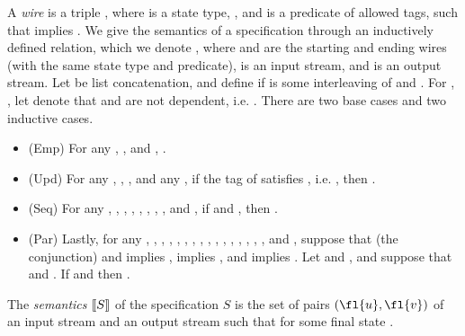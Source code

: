 \begin{definition}
\label{def:prog-model-semantics}
A \emph{wire} is a triple
,
where
 is a state type,
,
and 
is a predicate of allowed tags,
such that  implies .
We give the semantics of a specification through an
inductively defined relation, which we denote
,
where
 and 
are the starting and ending wires
(with the same state type and predicate),
 is an input stream,
and  is an output stream.
Let  be list concatenation, and
define  if  is some interleaving of  and .
For , ,
let  denote that
 and  are not dependent, i.e.
\fl{,}\fl{))}.
There are two base cases and two inductive cases.
\begin{itemize}
\item (Emp)
For any , , and ,
.
\item (Upd)
For any , , , and any ,
if the tag of  satisfies , i.e.
\fl{)}, then
.
\item (Seq)
For any , , , , ,
, , , and , if
and
,
then
.
\item (Par)
Lastly, for any
, , ,
, , ,
,
, ,
, , , , , ,
, and ,
suppose that
(the conjunction)  and  implies
,
 implies , and
 implies .
Let
and
,
and suppose that
and
.
If
and
then
.
\end{itemize}
The \emph{semantics} $\llbracket S \rrbracket$ of the specification $S$
is the set of pairs $(\fl{u}, \fl{v})$
of an input stream  and an output stream  such that
for some final state .
\end{definition}

